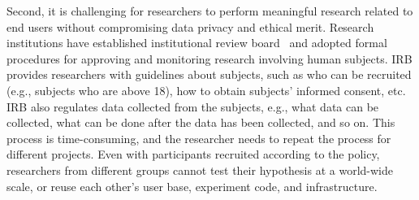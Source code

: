 Second, it is challenging for researchers to perform meaningful
research related to end users without compromising data privacy
and ethical merit. Research institutions have established 
institutional review board~\cite{irb} and adopted formal 
procedures for approving and monitoring research involving 
human subjects. IRB provides researchers with guidelines about 
subjects, such as who can be recruited (e.g., subjects
who are above 18), 
how to obtain subjects' informed consent, etc. IRB also 
regulates data collected from the subjects, e.g., what data can be collected, what can 
be done after the data has been collected, and so on. This
process is time-consuming, and the researcher needs to repeat
the process for different projects. Even with participants 
recruited according to the policy, researchers from different 
groups cannot test their hypothesis at a world-wide scale, or
reuse each other's user base, experiment code, and infrastructure.
  
